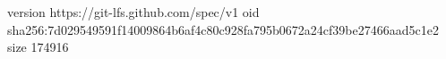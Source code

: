 version https://git-lfs.github.com/spec/v1
oid sha256:7d029549591f14009864b6af4c80c928fa795b0672a24cf39be27466aad5c1e2
size 174916
